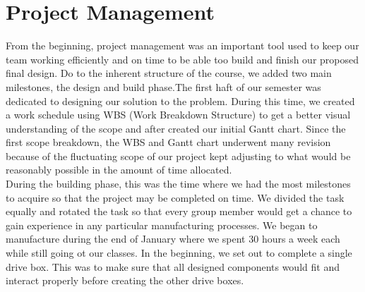 \section{Project Management}

From the beginning, project management was an important tool used to keep our team working efficiently and on time  to be able too build and finish our proposed final design. Do to the inherent structure of the course, we added two main milestones, the design and build phase.The first haft of our semester was dedicated to designing our solution to the problem. During this time, we created a work schedule using WBS (Work Breakdown Structure) to get a better visual understanding of the scope and after created our initial Gantt chart. Since the first scope breakdown, the WBS and Gantt chart underwent many revision because of the fluctuating scope of our project kept adjusting to what would be reasonably possible in the amount of time allocated.\\

During the building phase, this was the time where we had the most milestones to acquire so that the project may be completed on time. We divided the task equally and rotated the task so that every group member would get a chance to gain experience in any particular manufacturing processes. We began to manufacture during the end of January where we spent 30 hours a week each while still going ot our classes. In the beginning, we set out to complete a single drive box. This was to make sure that all designed components would fit and interact properly before creating the other drive boxes. 



 

